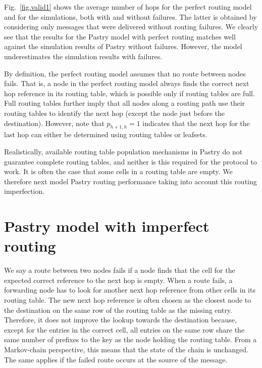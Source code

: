 \documentclass[10pt,twocolumn]{article}
\begin{document}
Fig.~\ref{fig.valid1} shows the average number of hops for the perfect routing
model and for the simulations, both with and without failures. The latter is
obtained by considering only messages that were delivered without routing
failures. We clearly see that the results for the Pastry model with perfect
routing matches well against the simulation results of Pastry without failures.
However, the model underestimates the simulation results with failures.

By definition, the perfect routing model assumes that no route between nodes
fails. That is, a node in the perfect routing model always finds the correct
next hop reference in its routing table, which is possible only if routing
tables are full. Full routing tables further imply
that all nodes along a routing path use their routing tables to identify the
next hop (except the node just before the destination). However, note that
$p_{{h+1},{h}} =1$ indicates that the next hop for the last hop can either be
determined using routing tables or leafsets.

Realistically, available routing table population mechanisms in Pastry do not
guarantee complete routing tables, and neither is this required for the
protocol to work. It is often the case that some cells in a routing table are
empty.  We therefore next model Pastry routing performance taking into account
this routing imperfection.

\section{Pastry model with imperfect routing}
\label{mod.fpastry} We say a route between two nodes fails if a node finds that
the cell for the expected correct reference to the next hop is empty. When a
route fails, a forwarding node has to look for another next hop reference from
other cells in its routing table. The new next hop reference is often chosen as
the closest node to the destination on the same row of the routing table as the
missing entry. Therefore, it does not improve the lookup towards the
destination because, except for the entries in the correct cell, all entries on
the same row share the same number of prefixes to the key as the node holding
the routing table. From a Markov-chain perspective, this means that the state
of the chain is unchanged. The same applies if the failed route occurs at the
source of the message.
\end{document}

